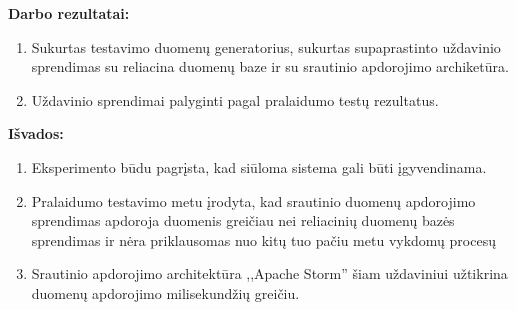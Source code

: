 \documentclass{VUMIFPSkursinis}
\begin{document}



\textbf{Darbo rezultatai:}
\vspace{1 mm}

    \begin{enumerate}
        \item Sukurtas testavimo duomenų generatorius, sukurtas supaprastinto uždavinio sprendimas su reliacina duomenų baze ir su srautinio apdorojimo archiketūra.
        \item Uždavinio sprendimai palyginti pagal pralaidumo testų rezultatus.
    \end{enumerate}
    \vspace{1 mm}

\textbf{Išvados:}
\vspace{1 mm}

    \begin{enumerate}
    \item Eksperimento būdu pagrįsta, kad siūloma sistema gali būti įgyvendinama.
    \item Pralaidumo testavimo metu įrodyta, kad srautinio duomenų apdorojimo sprendimas apdoroja duomenis greičiau nei reliacinių duomenų
    bazės sprendimas ir nėra priklausomas nuo kitų tuo pačiu metu vykdomų procesų
    \item Srautinio apdorojimo architektūra ,,Apache Storm'' šiam uždaviniui užtikrina duomenų apdorojimo milisekundžių greičiu.  

    \end{enumerate}

\printbibliography[heading=bibintoc] 
\end{document}
